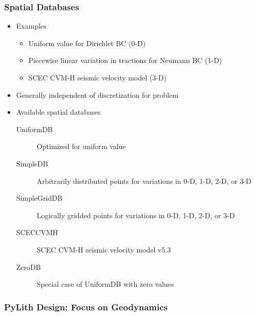 \documentclass[aspectratio=169]{beamer}
\begin{document}
\begin{frame}
  \frametitle{Spatial Databases}

  \begin{itemize}
 \item Examples
    \begin{itemize}
    \item Uniform value for Dirichlet BC (0-D)
    \item Piecewise linear variation in tractions for Neumann BC (1-D)
    \item SCEC CVM-H seismic velocity model (3-D)
    \end{itemize}
  \item Generally independent of discretization for problem
  \item Available spatial databases
    \begin{description}
    \item[UniformDB] Optimized for uniform value
    \item[SimpleDB] Arbitrarily distributed points for variations in 0-D, 1-D, 2-D, or 3-D
    \item[SimpleGridDB] Logically gridded points for variations in 0-D, 1-D, 2-D, or 3-D
    \item[SCECCVMH] SCEC CVM-H seismic velocity model v5.3
    \item[ZeroDB] Special case of UniformDB with zero values
    \end{description}
 \end{itemize}

\end{frame}

\begin{frame}
  \frametitle{PyLith Design: Focus on Geodynamics}


\end{frame}
\end{document}
